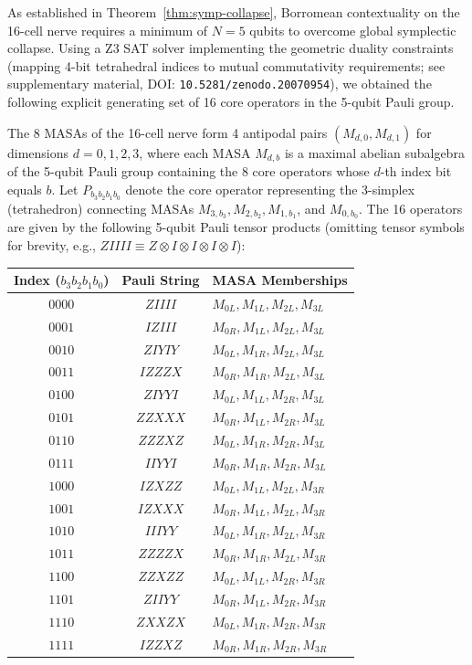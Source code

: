 \documentclass[11pt]{article}
\begin{document}
As established in Theorem~\ref{thm:symp-collapse}, Borromean contextuality on the 16-cell nerve requires a minimum of $N=5$ qubits to overcome global symplectic collapse. Using a Z3 SAT solver implementing the geometric duality constraints (mapping 4-bit tetrahedral indices to mutual commutativity requirements; see supplementary material, DOI: \texttt{10.5281/zenodo.20070954}), we obtained the following explicit generating set of 16 core operators in the 5-qubit Pauli group.

The 8 MASAs of the 16-cell nerve form 4 antipodal pairs $(M_{d,0}, M_{d,1})$ for dimensions $d = 0,1,2,3$, where each MASA $M_{d,b}$ is a maximal abelian subalgebra of the 5-qubit Pauli group containing the 8 core operators whose $d$-th index bit equals $b$. Let $P_{b_3 b_2 b_1 b_0}$ denote the core operator representing the 3-simplex (tetrahedron) connecting MASAs $M_{3,b_3}, M_{2,b_2}, M_{1,b_1}$, and $M_{0,b_0}$. The 16 operators are given by the following 5-qubit Pauli tensor products (omitting tensor symbols for brevity, e.g., $ZIIII \equiv Z \otimes I \otimes I \otimes I \otimes I$):

\begin{center}
\renewcommand{\arraystretch}{1.2}
\begin{tabular}{ccl}
\toprule
\textbf{Index ($b_3 b_2 b_1 b_0$)} & \textbf{Pauli String} & \textbf{MASA Memberships} \\
\midrule
$0000$ & $ZIIII$ & $M_{0L}, M_{1L}, M_{2L}, M_{3L}$ \\
$0001$ & $IZIII$ & $M_{0R}, M_{1L}, M_{2L}, M_{3L}$ \\
$0010$ & $ZIYIY$ & $M_{0L}, M_{1R}, M_{2L}, M_{3L}$ \\
$0011$ & $IZZZX$ & $M_{0R}, M_{1R}, M_{2L}, M_{3L}$ \\
$0100$ & $ZIYYI$ & $M_{0L}, M_{1L}, M_{2R}, M_{3L}$ \\
$0101$ & $ZZXXX$ & $M_{0R}, M_{1L}, M_{2R}, M_{3L}$ \\
$0110$ & $ZZZXZ$ & $M_{0L}, M_{1R}, M_{2R}, M_{3L}$ \\
$0111$ & $IIYYI$ & $M_{0R}, M_{1R}, M_{2R}, M_{3L}$ \\
$1000$ & $IZXZZ$ & $M_{0L}, M_{1L}, M_{2L}, M_{3R}$ \\
$1001$ & $IZXXX$ & $M_{0R}, M_{1L}, M_{2L}, M_{3R}$ \\
$1010$ & $IIIYY$ & $M_{0L}, M_{1R}, M_{2L}, M_{3R}$ \\
$1011$ & $ZZZZX$ & $M_{0R}, M_{1R}, M_{2L}, M_{3R}$ \\
$1100$ & $ZZXZZ$ & $M_{0L}, M_{1L}, M_{2R}, M_{3R}$ \\
$1101$ & $ZIIYY$ & $M_{0R}, M_{1L}, M_{2R}, M_{3R}$ \\
$1110$ & $ZXXZX$ & $M_{0L}, M_{1R}, M_{2R}, M_{3R}$ \\
$1111$ & $IZZXZ$ & $M_{0R}, M_{1R}, M_{2R}, M_{3R}$ \\
\bottomrule
\end{tabular}
\end{center}
\end{document}
